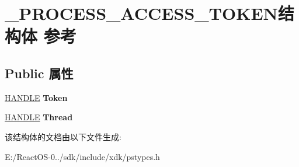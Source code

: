 \hypertarget{struct___p_r_o_c_e_s_s___a_c_c_e_s_s___t_o_k_e_n}{}\section{\+\_\+\+P\+R\+O\+C\+E\+S\+S\+\_\+\+A\+C\+C\+E\+S\+S\+\_\+\+T\+O\+K\+E\+N结构体 参考}
\label{struct___p_r_o_c_e_s_s___a_c_c_e_s_s___t_o_k_e_n}
\subsection*{Public 属性}
\begin{DoxyCompactItemize}
\item 
\mbox{\label{struct___p_r_o_c_e_s_s___a_c_c_e_s_s___t_o_k_e_n_a16087590923df8b4e3d81ac0474c45e2}} 
\hyperlink{interfacevoid}{H\+A\+N\+D\+LE} {\bfseries Token}
\item 
\mbox{\label{struct___p_r_o_c_e_s_s___a_c_c_e_s_s___t_o_k_e_n_a434d279bbd07e3118e349e80949eb59b}} 
\hyperlink{interfacevoid}{H\+A\+N\+D\+LE} {\bfseries Thread}
\end{DoxyCompactItemize}


该结构体的文档由以下文件生成\+:\begin{DoxyCompactItemize}
\item 
E\+:/\+React\+O\+S-\/0../sdk/include/xdk/pstypes.\+h\end{DoxyCompactItemize}
